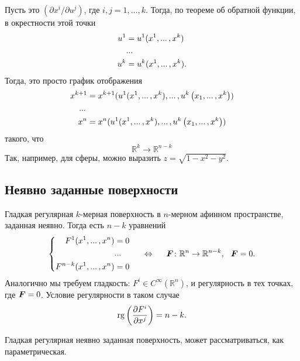 Пусть это $(\partial x^i / \partial u^j)$, где $i, j = 1, \ldots, k$. Тогда,  по теореме об обратной функции, в окрестности этой точки 
\begin{align*}
    u^1 &= u^1 ({x}^{1}, ... \,, {x}^{k}) \\
    &... \, \\
    u^k &= u^k ({x}^{1}, ... \,, {x}^{k}).
\end{align*}
Тогда, это просто график отображения 
\begin{align*}
    x^{k+1} &= x^{k+1} (u^1 ({x}^{1}, ... \,, {x}^{k}), ... \,, u^k\left(x_1, ... \,, x^k\right)) \\
    ... \,\\
    x^{n} &= x^{n} (u^1 ({x}^{1}, ... \,, {x}^{k}), ... \,, u^k\left(x_1, ... \,, x^k\right)) \\
\end{align*}
такого, что
$$
    \mathbb{R}^k \to \mathbb{R}^{n-k}
$$
Так, например, для сферы, можно выразить $z = \sqrt{1 - x^2 - y^2}$.




\subsection{Неявно заданные поверхности}
Гладкая регулярная $k$-мерная поверхность в $n$-мерном афинном пространстве, заданная неявно.  Тогда есть $n-k$ уравнений
\begin{align*}
    \left\{\begin{aligned}
        F^1 ({x}^{1}, ... \,, {x}^{n})&=0\\
        &... \,\\
        F^{n-k} ({x}^{1}, ... \,, {x}^{n}) &= 0
    \end{aligned}\right.
    \hspace{0.5cm} \Leftrightarrow \hspace{0.5cm} 
    \mbox{\boldmath $F$} \colon \mathbb{R}^n \to \mathbb{R}^{n-k}, \hspace{0.25cm} \mbox{\boldmath $F$}=0.
\end{align*}
Аналогично мы требуем гладкость: $F^i \in C^\infty \left(\mathbb{R}^n\right)$, и регулярность в тех точках, где $\mbox{\boldmath $F$}=0$. Условие регулярности в таком случае
\begin{equation}
    \mathop{\mathrm{rg}}\nolimits \left(\frac{\partial F^i}{\partial x^j} \right) = n-k.
\end{equation}

\begin{to_lem} 
     Гладкая регулярная неявно заданная поверхность, может рассматриваться, как параметрическая.
\end{to_lem}

